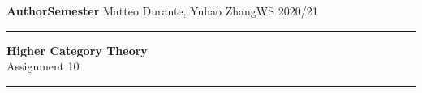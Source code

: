 \documentclass[a4paper,11pt,openany]{scrartcl}
\begin{document}
\noindent\textbf{Author}\hfill\textbf{Semester} \linebreak
\vspace*{-.1cm} Matteo Durante, Yuhao Zhang\hfill WS 2020/21 \\

\noindent
\rule{\linewidth}{1pt}
\begin{center}
\Large
\textbf{Higher Category Theory} \\
Assignment 10
\end{center}
\rule{\linewidth}{1pt}
\\


\newcommand{\La}{\Lambda}
\newcommand{\pa}{\partial}
\newcommand{\ob}{\operatorname{Ob}}
\newcommand{\mor}{\operatorname{Mor}}
\newcommand{\sto}{\twoheadrightarrow}

\newcommand{\plim}{\varprojlim}
\newcommand{\sst}{\subseteq}
\newcommand{\eq}{\operatorname{eq}}

\newcommand{\f}{\varphi}

\newcommand{\sing}{\operatorname{Sing}}

\newcommand{\ihom}{\underline{\Hom}}


~\\
\end{document}
